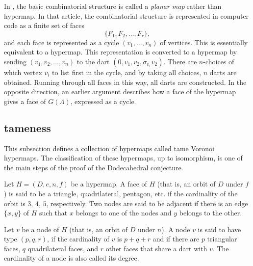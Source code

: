 \begin{remark}
In \cite{arx}, the basic combinatorial structure is called a {\it planar map} rather
than hypermap.  In that article, the combinatorial structure is represented in
computer code as a finite set of faces
 $$
  \{F_1,F_2,\ldots,F_r\},
 $$
and each face is represented as a cycle $(v_1,\ldots,v_n)$ of vertices.  This is
essentially equivalent to a hypermap.  This representation
is converted to a hypermap by sending $(v_1,v_2,\ldots,v_n)$ to the dart
$(0,v_1,v_2,\sigma_{v_1} v_2)$.  There are $n$-choices of which vertex $v_i$ to list
first in the cycle, and by taking all choices, $n$ darts are obtained.  Running
through all faces in this way, all darts are constructed.  In the opposite direction,
an earlier argument describes how a face of the hypermap gives a face of $G(\Lambda)$,
expressed as a cycle.
\end{remark}

\subsection{tameness}

This subsection defines a collection of hypermaps called tame Voronoi hypermaps.
The classification of these hypermaps, up to isomorphism, is one of the main steps
of the proof of the Dodecahedral conjecture.

Let $H=(D,e,n,f)$ be a hypermap.  A face of $H$ (that is, an orbit
of $D$ under $f$) is said to be a triangle, quadrilateral, pentagon, etc. if the cardinality
of the orbit is $3$, $4$, $5$, respectively.  Two nodes are said
to be adjacent
if there is an edge $\{x,y\}$ of $H$ such that $x$ belongs to one of the nodes and
$y$ belongs to the other.

  Let $v$ be a node of $H$ (that is, an orbit
of $D$ under $n$).  
A node $v$ is said to have type $(p,q,r)$, if the cardinality of $v$ is $p+q+r$ and if
there are $p$ triangular faces, $q$ quadrilateral faces, and $r$ other faces
that share a dart with $v$.  The cardinality of a node is also
called its degree.

